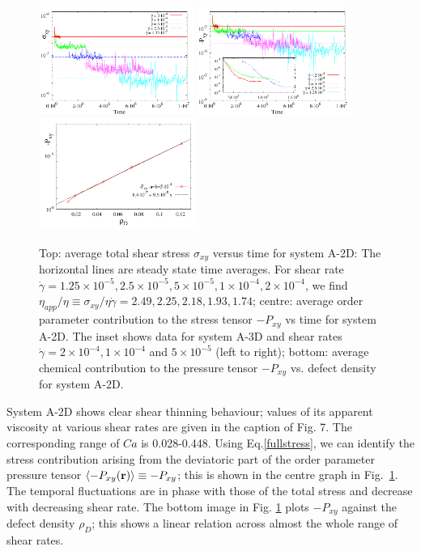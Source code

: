 \documentclass[8.5pt,twoside,twocolumn]{article}
\newcommand{\e}[1]{\times10^{#1}}
\begin{document}
\begin{figure}[htp!]
\centering
\includegraphics[angle=0,width=0.45\textwidth]{S_xy_tot_t_5e-4.pdf}
\includegraphics[angle=0,width=0.45\textwidth]{P_xy_chem_t_5e-4.pdf}
\includegraphics[angle=0,width=0.465\textwidth]{P_xy_defect_density.pdf}
\caption{Top: average total shear stress $\sigma_{xy}$ versus time for system A-2D: The horizontal lines are steady state time averages. For shear rate $\dot{\gamma}=1.25\e{-5}, 2.5\e{-5}, 5\e{-5}, 1\e{-4}, 2\e{-4}$, we find $\eta_{app}/\eta\equiv\sigma_{xy}/ \eta \dot{\gamma}=2.49, 2.25, 2.18, 1.93, 1.74$; centre: average order parameter contribution to the stress tensor $-P_{xy}$ vs time for system A-2D. The inset shows data for system A-3D and shear rates $\dot{\gamma}=2\times10^{-4}, 1\times10^{-4}$ and $5\times10^{-5}$ (left to right); bottom: average chemical contribution to the pressure tensor $-P_{xy}$ vs. defect density for system A-2D.}
\label{fig7}
\end{figure}


System A-2D shows clear shear thinning behaviour; values of its apparent viscosity at various shear rates are given in the caption of Fig. 7. The corresponding range of $Ca$ is 0.028-0.448. Using Eq.\ref{fullstress}, we can identify the stress contribution arising from the deviatoric part of the order parameter pressure tensor
$\langle - P_{xy}({\bf r})\rangle\equiv - P_{xy}$; this is shown in the centre graph in Fig.~\ref{fig7}. The temporal fluctuations are in phase with those of the total stress and decrease with decreasing shear rate.
The bottom image in Fig. \ref{fig7} plots $- P_{xy}$ against the defect density $\rho_D$; this shows a linear relation across almost the whole range of shear rates.
\end{document}
